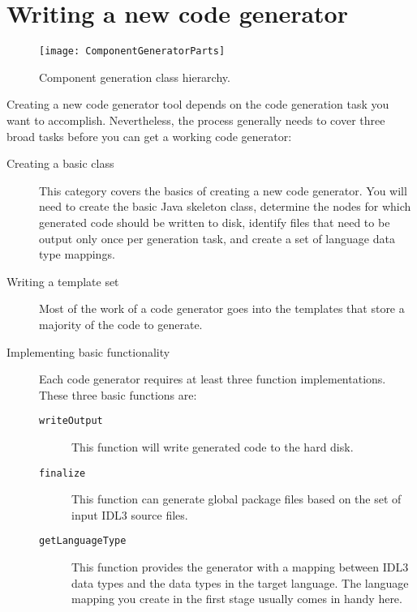\section{Writing a new code generator}

\begin{figure}[!htb]
\centering
\texttt{[image: ComponentGeneratorParts]}
\caption{Component generation class hierarchy.}
\label{fig:component-generator-parts}
\end{figure}

Creating a new code generator tool depends on the code generation task you want
to accomplish. Nevertheless, the process generally needs to cover three broad
tasks before you can get a working code generator:

\begin{description}
\item [Creating a basic class] This category covers the basics of creating a new
      code generator. You will need to create the basic Java skeleton class,
      determine the nodes for which generated code should be written to disk,
      identify files that need to be output only once per generation task, and
      create a set of language data type mappings.
\item [Writing a template set] Most of the work of a code generator goes into
      the templates that store a majority of the code to generate.
\item [Implementing basic functionality] Each code generator requires at least
      three function implementations. These three basic functions are:
      \begin{description}
      \item [{\tt writeOutput}] This function will write generated code to the
            hard disk.
      \item [{\tt finalize}] This function can generate global package files
            based on the set of input IDL3 source files.
      \item [{\tt getLanguageType}] This function provides the generator with a
            mapping between IDL3 data types and the data types in the target
            language. The language mapping you create in the first stage usually
            comes in handy here.
      \end{description}
\end{description}

